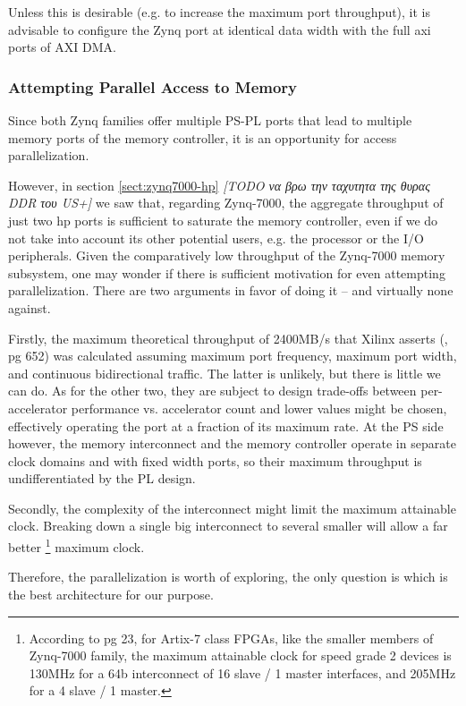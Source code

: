 Unless this is desirable (e.g. to increase the maximum port throughput),
it is advisable to configure the Zynq port at identical data width with the
full \gls{axi} ports of AXI DMA.

\subsubsection{Attempting Parallel Access to Memory}

Since both Zynq families offer multiple PS-PL ports that lead to 
multiple memory ports of the memory controller,
it is an opportunity for access parallelization.

However, in section \ref{sect:zynq7000-hp} 
\emph{[TODO να βρω την ταχυτητα της θυρας DDR του US+]} 
we saw that, regarding Zynq-7000,
the aggregate throughput of just two \gls{hp} ports
is sufficient to saturate the memory controller, 
even if we do not take into account its other potential users, 
e.g. the processor or the I/O peripherals.
Given the comparatively low throughput of the Zynq-7000 memory subsystem,
one may wonder if there is sufficient motivation for even attempting parallelization.
There are two arguments in favor of doing it -- and virtually none against.

Firstly, the maximum theoretical throughput of 2400MB/s that Xilinx asserts (\cite{ug585}, pg 652)
was calculated assuming maximum port frequency, maximum port width, and continuous bidirectional
traffic. The latter is unlikely, but there is little we can do. As for the other two,
they are subject to design trade-offs between per-accelerator performance vs. accelerator count
and lower values might be chosen, effectively operating the port at a fraction of its
maximum rate. At the PS side however, the memory interconnect and the memory controller
operate in separate clock domains and with fixed width ports,
so their maximum throughput is undifferentiated by the PL design.

Secondly, the complexity of the interconnect might limit the maximum attainable clock.
Breaking down a single big interconnect to several smaller will allow a far better
	\footnote{
		According to \cite{pg059} pg 23, for Artix-7 class FPGAs, 
		like the smaller members of Zynq-7000 family, the maximum attainable
		clock for speed grade 2 devices is 130MHz for a 64b interconnect of
		16 slave / 1 master interfaces, and 205MHz for a 4 slave / 1 master.
	}
maximum clock.

Therefore, the parallelization is worth of exploring, the only question is
which is the best architecture for our purpose.

